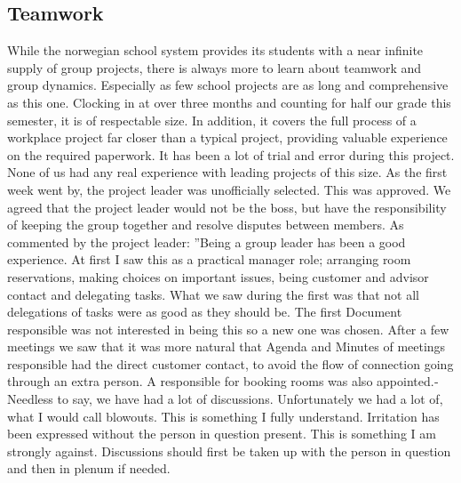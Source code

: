 \subsection{Teamwork}
While the norwegian school system provides its students with a near infinite supply of group projects, there is always more to learn about teamwork and group dynamics. Especially as few school projects are as long and comprehensive as this one. Clocking in at over three months and counting for half our grade this semester, it is of respectable size. In addition, it covers the full process of a workplace project far closer than a typical project, providing valuable experience on the required paperwork.
\newline
\newline
It has been a lot of trial and error during this project. None of us had any real experience with leading projects of this size. As the first week went by, the project leader was unofficially selected. This was approved. We agreed that the project leader would not be the boss, but have the responsibility of keeping the group together and resolve disputes between members. As commented by the project leader:
\newline
\newline
''Being a group leader has been a good experience. At first I saw this as a practical manager role; arranging room reservations, making choices on important issues, being customer and advisor contact and delegating tasks.
\newline 
\newline
What we saw during the first was that not all delegations of tasks were as good as they should be. The first Document responsible was not interested in being this so a new one was chosen.
\newline 
\newline
After a few meetings we saw that it was more natural that Agenda and Minutes of meetings responsible had the direct customer contact, to avoid the flow of connection going through an extra person. A responsible for booking rooms was also appointed.­­­­
\newline
\newline
Needless to say, we have had a lot of discussions. Unfortunately we had a lot of, what I would call blowouts. This is something I fully understand. Irritation has been expressed without the person in question present. This is something I am strongly against. Discussions should first be taken up with the person in question and then in plenum if needed.
